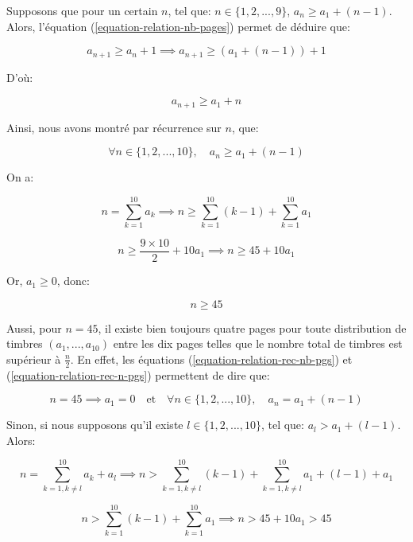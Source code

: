 \documentclass[12pt,a4paper,article]{memoir}
\begin{document}
\bigskip

Supposons que pour un certain $n$, tel que: $n \in \{1, 2, ..., 9\}$, $a_{n} \geq a_{1} + (n-1)$.
Alors, l'équation (\ref{equation-relation-nb-pages}) permet de déduire que:

\[a_{n+1} \geq a_{n} + 1 \implies a_{n+1} \geq (a_{1} + (n-1))+ 1\]

D'où:

\[a_{n+1} \geq a_{1} + n\]

Ainsi, nous avons montré par récurrence sur $n$, que:

\begin{equation}
\forall n \in \{1, 2, ..., 10\}, \quad a_{n} \geq a_{1} + (n-1)
\label{equation-relation-rec-nb-pgs}
\end{equation}

On a:

\[n = \sum_{k=1}^{10} a_{k} \implies n \geq \sum_{k=1}^{10}(k-1) + \sum_{k=1}^{10}a_{1}\]

\begin{equation}
n \geq \frac{9 \times 10}{2} + 10a_{1} \implies n \geq 45 + 10a_{1}
\label{equation-relation-rec-n-pgs}
\end{equation}

Or, $a_{1} \geq 0$, donc:

\begin{equation}
n \geq 45
\label{equation-val-min-n}
\end{equation}

Aussi, pour $n = 45$, il existe bien toujours quatre pages pour toute distribution de timbres $(a_{1}, ..., a_{10})$ entre les dix pages telles que le nombre total de timbres est supérieur à $\frac{n}{2}$. En effet, les équations (\ref{equation-relation-rec-nb-pgs}) et (\ref{equation-relation-rec-n-pgs}) permettent de dire que:

\begin{equation}
n = 45 \implies a_{1} = 0 \quad \textrm{et} \quad \forall n \in \{1, 2, ..., 10\}, \quad a_{n} = a_{1} + (n-1)
\label{equation-min-n-a-k}
\end{equation}

Sinon, si nous supposons qu'il existe $l \in \{1, 2, ..., 10\}$, tel que: $a_{l} > a_{1} + (l-1)$. Alors:

\[n = \sum_{k=1, k \neq l}^{10} a_{k} + a_{l} \implies n > \sum_{k=1, k \neq l}^{10}(k-1) + \sum_{k=1, k \neq l}^{10}a_{1} + (l-1) + a_{1}\]

\[n > \sum_{k=1}^{10}(k-1) + \sum_{k=1}^{10}a_{1} \implies n > 45 + 10a_{1} > 45\]
\end{document}
